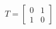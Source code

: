 \documentclass[preview]{standalone}
\begin{document}
\begin{align*}
T = \begin{bmatrix} 0 & 1 \\ 1 & 0\end{bmatrix}
\end{align*}
\end{document}
